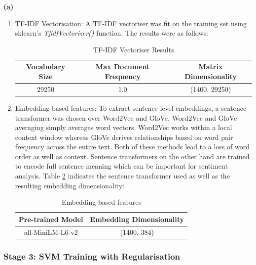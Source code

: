 \noindent\textbf{(a)}
\begin{enumerate}[label=\roman*., topsep=0pt, itemsep=2pt]
    \item TF-IDF Vectorisation: A TF-IDF vectoriser was fit on the training set using sklearn's \emph{TfidfVectorizer()} function. The results were as follows:
            \begin{table}[htbp]
            \caption{TF-IDF Vectoriser Results}
            \centering
            \begin{tabular}{ccc}
            \hline
            \textbf{Vocabulary Size} & \textbf{Max Document Frequency} & \textbf{Matrix Dimensionality} \\
            \hline
            29250 & 1.0 & (1400, 29250) \\
            \hline
            \end{tabular}
            \label{tfidf}
            \end{table}
    \item Embedding-based features: To extract sentence-level embeddings, a sentence transformer was chosen over Word2Vec and GloVe. Word2Vec and GloVe averaging simply averages word vectors. 
          Word2Vec works within a local context window whereas GloVe derives relationships based on word pair frequency across the entire text. Both of these methods lead to a loss of word order 
          as well as context. Sentence transformers on the other hand are trained to encode full sentence meaning which can be important for sentiment analysis. Table \ref{embedding}
          indicates the sentence transformer used as well as the resulting embedding dimensionality:
            \begin{table}[htbp]
            \caption{Embedding-based features}
            \centering
            \begin{tabular}{cc}
            \hline
            \textbf{Pre-trained Model} & \textbf{Embedding Dimensionality} \\
            \hline
            all-MiniLM-L6-v2 & (1400, 384) \\
            \hline
            \end{tabular}
            \label{embedding}
            \end{table}
\end{enumerate}

\subsubsection{Stage 3: SVM Training with Regularisation}

